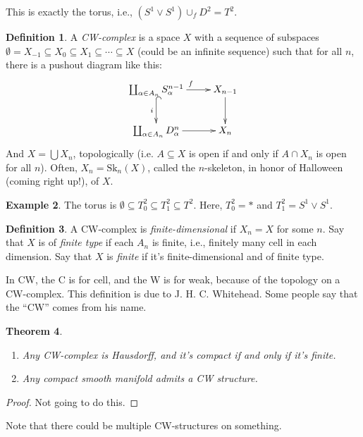 \documentclass{amsart}
\theoremstyle{theorem}
\newtheorem{theorem}{Theorem}[section]
\theoremstyle{definition}
\newtheorem{definition}[theorem]{Definition}
\newtheorem{example}[theorem]{Example}
\begin{document}
This is exactly the torus, i.e., $(S^1\vee S^1)\cup_f D^2=T^2$.
\begin{definition}
A \emph{CW-complex} is a space $X$ with a sequence of subspaces $\emptyset=X_{-1}\subseteq X_0\subseteq X_1\subseteq\cdots\subseteq X$ (could be an infinite sequence) such that for all $n$, there is a pushout diagram like this:
\begin{equation*}
\xymatrix{\coprod_{\alpha\in A_n}S^{n-1}_\alpha\ar[r]^f\ar@{^(->}[d]_i & X_{n-1}\ar[d]\\
\coprod_{\alpha\in A_n}D^n_\alpha\ar[r] & X_{n}}
\end{equation*}
And $X=\bigcup X_n$, topologically (i.e. $A\subseteq X$ is open if and only if $A\cap X_n$ is open for all $n$). Often, $X_n=\mathrm{Sk}_n(X)$, called the $n$-skeleton, in honor of Halloween (coming right up!), of $X$.
\end{definition}
\begin{example}
The torus is $\emptyset\subseteq T^2_0\subseteq T^2_1\subseteq T^2$. Here, $T^2_0=\ast$ and $T^2_1=S^1\vee S^1$.
\end{example}
\begin{definition}
A CW-complex is \emph{finite-dimensional} if $X_n=X$ for some $n$. Say that $X$ is of \emph{finite type} if each $A_n$ is finite, i.e., finitely many cell in each dimension. Say that $X$ is \emph{finite} if it's finite-dimensional and of finite type.
\end{definition}
In CW, the C is for cell, and the W is for weak, because of the topology on a CW-complex. This definition is due to J. H. C. Whitehead. Some people say that the ``CW'' comes from his name.
\begin{theorem}
\begin{enumerate}
\item Any CW-complex is Hausdorff, and it's compact if and only if it's finite.
\item Any compact smooth manifold admits a CW structure.
\end{enumerate}
\end{theorem}
\begin{proof}
Not going to do this.
\end{proof}
Note that there could be multiple CW-structures on something.
\end{document}
